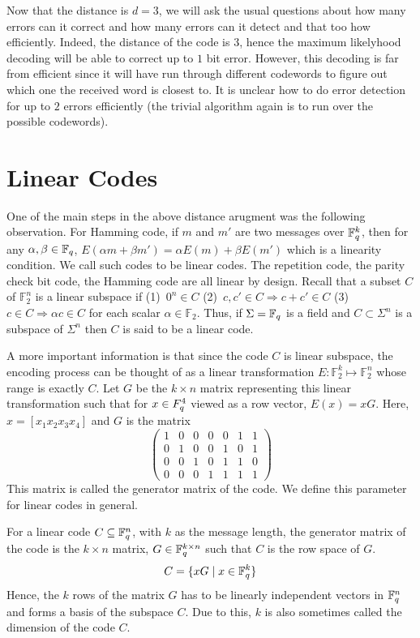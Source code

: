 Now that the distance is $d=3$, we will ask the usual questions about how many errors can it correct and how many errors can it detect and that too how efficiently. Indeed, the distance of the code is $3$, hence the maximum likelyhood decoding will be able to correct up to $1$ bit error. However, this decoding is far from efficient since it will have run through different codewords to figure out which one the received word is closest to. It is unclear how to do error detection for up to $2$ errors efficiently (the trivial algorithm again is to run over the possible codewords).

\section{Linear Codes}
One of the main steps in the above distance arugment was the following observation. For Hamming code, if $m$ and $m'$ are two messages over ${\mathbb{F}}_q^k$, then for any $\alpha, \beta \in {\mathbb{F}}_q$, $E(\alpha m+\beta m') = \alpha E(m)+\beta E(m')$ which is a linearity condition. We call such codes to be linear codes. The repetition code, the parity check bit code, the Hamming code are all linear by design.
Recall that a subset $C$ of $\mathbb{F}_2^n$ is a linear subspace if (1)~$0^n \in C$ (2)~$c,c' \in C \Rightarrow c+c' \in C$ 
(3)~$c \in C \Rightarrow \alpha c \in C$ for each scalar $\alpha \in \mathbb{F}_2$.
Thus, if $\Sigma = {\mathbb{F}}_q$ is a field and $C \subset \Sigma^n$ is a subspace of $\Sigma^n$ then $C$ is said to be a linear code. 

A more important information is that since the code $C$ is linear subspace, the encoding process can be thought of as a linear transformation $E: \mathbb{F}_2^k \mapsto \mathbb{F}_2^n$ whose range is exactly $C$. Let $G$ be the $k \times n$ matrix representing this linear transformation such that for $x \in \\F_q^4$ viewed as a row vector, $E(x) = xG$.  Here, $x=[x_1 x_2 x_3 x_4]$ and $G$ is the matrix
\[ \left( \begin{array}{ccccccc}
1 & 0 & 0 & 0 & 0 & 1 & 1 \\
0 & 1 & 0 & 0 & 1 & 0 & 1 \\
0 & 0 & 1 & 0 & 1 & 1 & 0 \\
0 & 0 & 0 & 1 & 1 & 1 & 1 
\end{array} \right)\] 
This matrix is called the generator matrix of the code. 
We define this parameter for linear codes in general.

\begin{definition}
For a linear code $C \subseteq {\mathbb{F}}_q^n$, with $k$ as the message length, the generator matrix of the code is the $k \times n$ matrix, $G \in {\mathbb{F}}_q^{k \times n}$ such that $C$ is the row space of $G$.
$$C = \{ xG \mid x \in {\mathbb{F}}_q^k \}$$
Hence, the $k$ rows of the matrix $G$ has to be linearly independent vectors in ${\mathbb{F}}_q^n$ and forms a basis of the subspace $C$. Due to this, $k$ is also sometimes called the dimension of the code $C$.
\end{definition}

